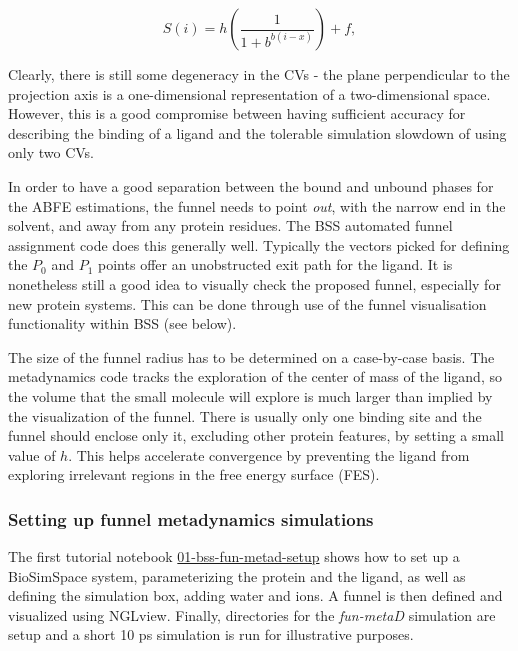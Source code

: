 \begin{equation}
S(i) = h\left(\frac{1}{1+b^{b(i-x)}}\right) + f,
\end{equation}

Clearly, there is still some degeneracy in the CVs - the plane
perpendicular to the projection axis is a one-dimensional representation of a two-dimensional space. However, this is a good compromise between having sufficient accuracy for describing the binding of a ligand and the tolerable simulation slowdown of using only two CVs.

In order to have a good separation between the bound and unbound phases for the ABFE estimations, the funnel needs to point \emph{out}, with the narrow end in the solvent,
and away from any protein residues. The BSS automated funnel assignment code does this generally well. Typically the vectors picked for defining the $P_{0}$ and $P_{1}$ points offer an unobstructed exit path for the ligand. It is nonetheless still a good idea to visually check the proposed funnel, especially for new protein systems. This can be done through use of the funnel visualisation functionality within BSS (see below).

The size of the funnel radius has to be determined on a case-by-case basis. The metadynamics code tracks the exploration of the center of mass of the ligand, so the volume that the small molecule will explore is much larger than implied by the visualization of the funnel. There is usually only one binding site and the funnel should enclose only it, excluding other protein features, by setting a small value of $h$. This helps accelerate convergence by preventing the ligand from exploring irrelevant regions in the free energy surface (FES). 

\hypertarget{setupfunmetad}{%
\subsubsection{Setting up funnel metadynamics simulations}\label{setupfunmetad}}

The first tutorial notebook \href{https://github.com/OpenBioSim/biosimspace_tutorials/blob/main/02_funnel_metad/01_bss-fun-metad-setup.ipynb}{01-bss-fun-metad-setup} shows how to set up a BioSimSpace system, parameterizing the protein and the ligand, as well as defining the simulation box, adding water and ions. A funnel is then defined and visualized using NGLview. Finally, directories for the \emph{fun-metaD} simulation are setup and a short 10 ps simulation is run for illustrative purposes.


